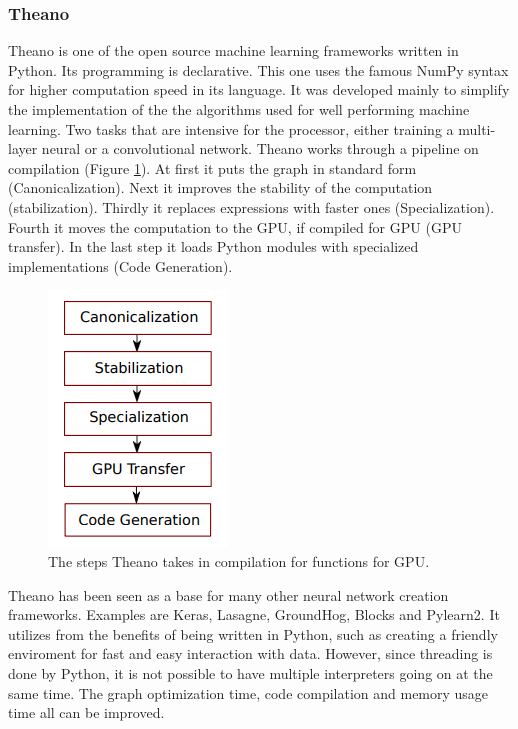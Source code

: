 \documentclass[10pt,a4paper]{article}
\begin{document}
	\subsubsection{Theano}
	
	Theano is one of the open source machine learning frameworks written in 
	Python.\cite{bergstra2010theano} Its programming is declarative. 
	\cite{rampasek2016tensorflow} This one uses the famous NumPy syntax for 
	higher computation speed 
	in its language. It was developed mainly to simplify the implementation of 
	the the algorithms used for well performing machine learning. Two tasks 
	that are intensive for the processor, either training a multi-layer neural 
	or a convolutional network. Theano works through a pipeline on compilation 
	(Figure \ref{fig:TheanoPipe}). At first it puts the graph in standard form 
	(Canonicalization). Next it improves the stability of the computation 
	(stabilization). Thirdly it replaces expressions with faster ones 
	(Specialization). Fourth it moves the computation to the GPU, if compiled 
	for GPU (GPU transfer). In the last step it loads Python modules with 
	specialized implementations (Code Generation). \cite{bergstra2010theano}
	
	\begin{figure}[h!]
		\includegraphics{TheanoPipeline.PNG}
		\caption{The steps Theano takes in compilation for functions for GPU. 
		\cite{bergstra2010theano}}
		\label{fig:TheanoPipe}
	\end{figure}
	
	Theano has been seen as a base for many other neural network creation 
	frameworks. Examples are Keras, Lasagne, GroundHog, Blocks and Pylearn2. It 
	utilizes from the benefits of being written in Python, such as creating a 
	friendly enviroment for fast and easy interaction with data. However, since 
	threading is done by Python, it is not possible to have multiple 
	interpreters going on at the same time. The graph optimization time, code 
	compilation and memory usage time all can be improved. \cite{al2016theano}
	
\end{document}
